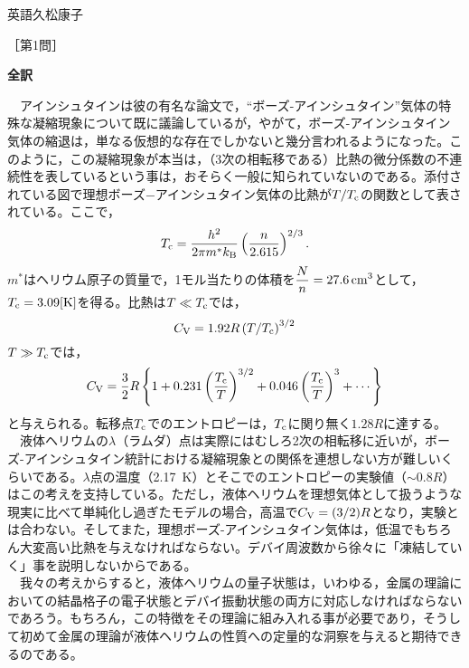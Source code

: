 \documentclass[fleqn]{jbook}
\def\c{{\rm c}}
\def\B{{\rm B}}
\def\V{{\rm V}}
\begin{document}
\begin{answer}{英語}{久松康子}



［第1問］

\textbf{全訳}

　アインシュタインは彼の有名な論文で，“ボーズ-アインシュタイン”気体の特殊な凝縮現象について既に議論しているが，やがて，ボーズ-アインシュタイン気体の縮退は，単なる仮想的な存在でしかないと幾分言われるようになった。このように，この凝縮現象が本当は，（3次の相転移である）比熱の微分係数の不連続性を表しているという事は，おそらく一般に知られていないのである。添付されている図で理想ボーズ−アインシュタイン気体の比熱が$T/T_\c$の関数として表されている。ここで，
\begin{equation*}
T_\c=\frac{h^2}{2\pi m^\ast k_\B}\left(\frac{n}{2.615}\right)^{2/3}.
\end{equation*}
$m^\ast $はヘリウム原子の質量で，1モル当たりの体積を$\displaystyle \frac{N}{n} = 27.6 \,{\rm cm^3}$として，$T_\c=3.09[\mathrm{K} ]$を得る。比熱は$T\ll T_\c$では，
\begin{equation*}
C_\V=1.92R\left(T/T_\c\right)^{3/2}
\end{equation*}
$T\gg T_\c$では，
\begin{equation*}
C_\V=\frac{3}{2}R\left\{ 1+0.231\left(\frac{T_\c}{T}\right)^{3/2}+0.046\left(\frac{T_\c}{T}\right)^{3}+ \cdots \right\} 
\end{equation*}
と与えられる。転移点$T_\c$でのエントロピーは，$T_\c$に関り無く$1.28R$に達する。\\
　液体ヘリウムの$\lambda $（ラムダ）点は実際にはむしろ2次の相転移に近いが，ボーズ-アインシュタイン統計における凝縮現象との関係を連想しない方が難しいくらいである。$\lambda $点の温度（2.17~K）とそこでのエントロピーの実験値（$\sim 0.8R$）はこの考えを支持している。ただし，液体ヘリウムを理想気体として扱うような現実に比べて単純化し過ぎたモデルの場合，高温で$C_\V=(3/2)R$となり，実験とは合わない。そしてまた，理想ボーズ-アインシュタイン気体は，低温でもちろん大変高い比熱を与えなければならない。デバイ周波数から徐々に「凍結していく」事を説明しないからである。 \\
　我々の考えからすると，液体ヘリウムの量子状態は，いわゆる，金属の理論においての結晶格子の電子状態とデバイ振動状態の両方に対応しなければならないであろう。もちろん，この特徴をその理論に組み入れる事が必要であり，そうして初めて金属の理論が液体ヘリウムの性質への定量的な洞察を与えると期待できるのである。


\end{answer}
\end{document}

